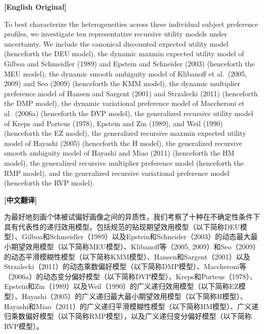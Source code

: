 \documentclass[12pt,a4paper]{ctexart}
\newenvironment{original}{%
  \par\medskip\noindent\textbf{[English Original]}\par\smallskip
  \color{black}\small
}{%
  \par\medskip
}
\newenvironment{translation}{%
  \par\noindent\textbf{[中文翻译]}\par\smallskip
  \color{blue}\small
}{%
  \par\bigskip
}
\theoremstyle{definition}
\theoremstyle{remark}
\begin{document}
\begin{original}
To best characterize the heterogeneities across these individual subject preference profiles, we investigate ten representative recursive utility models under uncertainty. We include the canonical discounted expected utility model (henceforth the DEU model), the dynamic maxmin expected utility model of Gilboa and Schmeidler (1989) and Epstein and Schneider (2003) (henceforth the MEU model), the dynamic smooth ambiguity model of Klibanoff et al.\ (2005, 2009) and Seo (2009) (henceforth the KMM model), the dynamic multiplier preference model of Hansen and Sargent (2001) and Strzalecki (2011) (henceforth the DMP model), the dynamic variational preference model of Maccheroni et al.\ (2006a) (henceforth the DVP model), the generalized recursive utility model of Kreps and Porteus (1978), Epstein and Zin (1989), and Weil (1990) (henceforth the EZ model), the generalized recursive maxmin expected utility model of Hayashi (2005) (henceforth the H model), the generalized recursive smooth ambiguity model of Hayashi and Miao (2011) (henceforth the HM model), the generalized recursive multiplier preference model (henceforth the RMP model), and the generalized recursive variational preference model (henceforth the RVP model).
\end{original}
\begin{translation}
为最好地刻画个体被试偏好画像之间的异质性，我们考察了十种在不确定性条件下具有代表性的递归效用模型。包括规范的贴现期望效用模型（以下简称DEU模型）、Gilboa和Schmeidler（1989）以及Epstein和Schneider（2003）的动态最大最小期望效用模型（以下简称MEU模型）、Klibanoff等（2005, 2009）和Seo（2009）的动态平滑模糊性模型（以下简称KMM模型）、Hansen和Sargent（2001）以及Strzalecki（2011）的动态乘数偏好模型（以下简称DMP模型）、Maccheroni等（2006a）的动态变分偏好模型（以下简称DVP模型）、Kreps和Porteus（1978）、Epstein和Zin（1989）以及Weil（1990）的广义递归效用模型（以下简称EZ模型）、Hayashi（2005）的广义递归最大最小期望效用模型（以下简称H模型）、Hayashi和Miao（2011）的广义递归平滑模糊性模型（以下简称HM模型）、广义递归乘数偏好模型（以下简称RMP模型），以及广义递归变分偏好模型（以下简称RVP模型）。
\end{translation}
\end{document}
